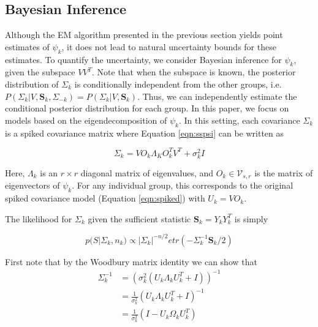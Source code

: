 \documentclass{article}
\newcommand{\bl}[1]{{\mathbf #1}}
\begin{document}


\subsection{Bayesian Inference}
\label{sec:bayes}

Although the EM algorithm presented in the previous section yields
point estimates of $\psi_k$, it does not lead to natural uncertainty
bounds for these estimates.  To quantify the uncertainty, we consider Bayesian
inference for $\psi_k$, given the
subspace $VV^T$.  Note that when the subspace is known, the posterior
distribution of $\Sigma_k$ is conditionally independent from the other
groups, i.e.  $P(\Sigma_{k} | V, \bl S_k, \Sigma_{-k}) = P(\Sigma_{k} | V, \bl S_k)$.
Thus, we can independently estimate the conditional posterior
distribution for each group.  In this paper, we focus on models based
on the eigendecomposition of $\psi_k$.  In this setting, each covariance
$\Sigma_k$ is a spiked covariance matrix where Equation \ref{eqn:sspsi}
can be written as

\begin{equation}
\Sigma_k = VO_k\Lambda_KO_k^TV^T + \sigma^2_kI
\label{eqn:ss}
\end{equation}

Here, $\Lambda_k$ is an $r \times r$ diagonal matrix of eigenvalues,
and $O_k \in \mathcal{V}_{s,r}$ is the matrix of eigenvectors of
$\psi_k$.  For any individual group, this corresponds to the original
spiked covariance model (Equation \ref{eqn:spiked}) with $U_k = VO_k$.

The likelihood for $\Sigma_k$ given the sufficient statistic $\mathbf{S}_k = Y_kY_k^T$ is simply

\begin{equation}
p(S | \Sigma_k,n_k) \propto |\Sigma_k|^{-n/2}etr(-\Sigma_k^{-1}\mathbf{S}_k/2)
\end{equation}

First note that by the Woodbury matrix identity we can show that 
\begin{align}
\Sigma^{-1}_k &=  (\sigma_k^2(U_k\Lambda_kU_k^T+I))^{-1}\\
&= \frac{1}{\sigma_k^2}(U_k\Lambda_kU_k^T+I)^{-1}\\
&= \frac{1}{\sigma_k^2}(I-U_k\Omega_kU_k^T)\\
\end{align}
\end{document}
